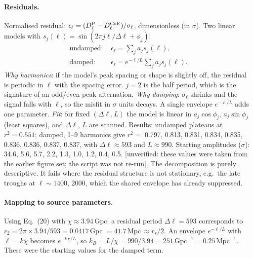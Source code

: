 \documentclass[10pt,twocolumn]{article}
\newcommand{\flag}[1]{\textsf{[unverified: #1]}}
\begin{document}
\paragraph{Residuals.} Normalised residual: $\epsilon_\ell=(D^{\rm P}_\ell-D^{\rm CoE}_\ell)/\sigma_\ell$, dimensionless (in $\sigma$). Two linear models with $s_j(\ell)=\sin(2\pi j\ell/\Delta\ell+\phi_j)$:
\begin{align}
\text{undamped: }&\epsilon_\ell=\textstyle\sum_ja_js_j(\ell),\\
\text{damped: }&\epsilon_\ell=e^{-\ell/L}\textstyle\sum_ja_js_j(\ell).
\end{align}
\emph{Why harmonics}: if the model's peak spacing or shape is slightly off, the residual is periodic in $\ell$ with the spacing error. $j=2$ is the half period, which is the signature of an odd/even peak alternation. \emph{Why damping}: $\sigma_\ell$ shrinks and the signal falls with $\ell$, so the misfit in $\sigma$ units decays. A single envelope $e^{-\ell/L}$ adds one parameter. \emph{Fit}: for fixed $(\Delta\ell,L)$ the model is linear in $a_j\cos\phi_j$, $a_j\sin\phi_j$ (least squares), and $\Delta\ell$, $L$ are scanned. Results: undamped plateaus at $r^2=0.551$; damped, 1--9 harmonics give $r^2=$ 0.797, 0.813, 0.831, 0.834, 0.835, 0.836, 0.836, 0.837, 0.837, with $\Delta\ell\approx593$ and $L\approx990$. Starting amplitudes ($\sigma$): 34.6, 5.6, 5.7, 2.2, 1.3, 1.0, 1.2, 0.4, 0.5. \flag{these values were taken from the earlier figure set; the script was not re-run}. The decomposition is purely descriptive. It fails where the residual structure is not stationary, e.g.\ the late troughs at $\ell\sim1400$, 2000, which the shared envelope has already suppressed.

\paragraph{Mapping to source parameters.} Using Eq.~(20) with $\chi\approx3.94$\,Gpc: a residual period $\Delta\ell=593$ corresponds to $r_2=2\pi\times3.94/593=0.0417$\,Gpc $=41.7$\,Mpc$\,\approx r_s/2$. An envelope $e^{-\ell/L}$ with $\ell=k\chi$ becomes $e^{-k\chi/L}$, so $k_B=L/\chi=990/3.94=251$\,Gpc$^{-1}=0.25$\,Mpc$^{-1}$. These were the starting values for the damped term.
\end{document}
